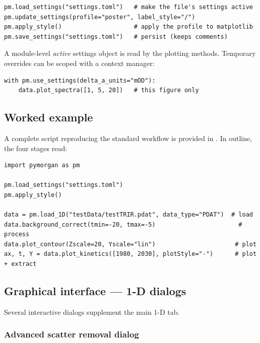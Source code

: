 \begin{lstlisting}
pm.load_settings("settings.toml")   # make the file's settings active
pm.update_settings(profile="poster", label_style="/")
pm.apply_style()                    # apply the profile to matplotlib
pm.save_settings("settings.toml")   # persist (keeps comments)
\end{lstlisting}

A module-level \emph{active} settings object is read by the plotting methods.
Temporary overrides can be scoped with a context manager:

\begin{lstlisting}
with pm.use_settings(delta_a_units="mOD"):
    data.plot_spectra([1, 5, 20])   # this figure only
\end{lstlisting}

\subsection{Worked example}
A complete script reproducing the standard workflow is provided in
. In outline, the four stages read:

\begin{lstlisting}
import pymorgan as pm

pm.load_settings("settings.toml")
pm.apply_style()

data = pm.load_1D("testData/testTRIR.pdat", data_type="PDAT")  # load
data.background_correct(tmin=-20, tmax=-5)                       # process
data.plot_contour(Zscale=20, Yscale="lin")                      # plot
ax, t, Y = data.plot_kinetics([1980, 2030], plotStyle="-")      # plot + extract
\end{lstlisting}

\subsection{Graphical interface — 1-D dialogs}\label{sec:oneD:gui:dialogs}

Several interactive dialogs supplement the main 1-D tab.

\subsubsection{Advanced scatter removal dialog}\label{sec:oneD:scatter:dialog}

